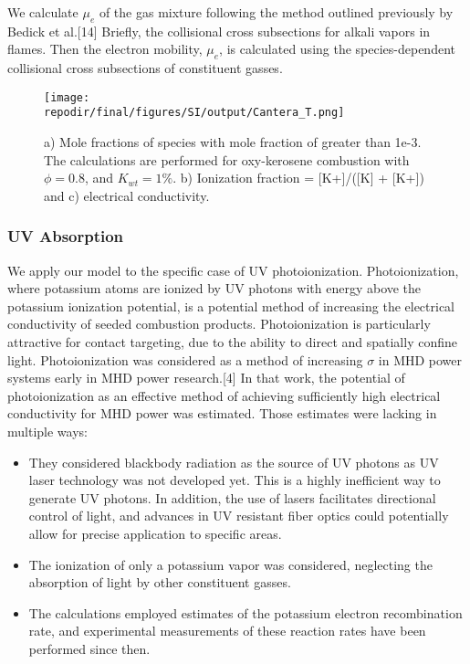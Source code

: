 We calculate $\mu_e$ of the gas mixture following the method outlined previously by Bedick et al.{[}14{]} Briefly, the collisional cross subsections for alkali vapors in flames. Then the electron mobility, \(\mu_{e}\), is calculated using the species-dependent collisional cross subsections of constituent gasses.

\begin{figure}[ht]
    \centering
    \texttt{[image: \\repodir/final/figures/SI/output/Cantera\_T.png]}
    \caption{a) Mole fractions of species with mole fraction of greater than 1e-3. The calculations are performed for oxy-kerosene combustion with \(\phi = 0.8\), and \(K_{wt} = 1\%\). b) Ionization fraction = {[}K+{]}/({[}K{]} + {[}K+{]}) and c) electrical conductivity.}
    \label{fig:SI_Cantera_T}
\end{figure} 


\hypertarget{photoionization}{%
\subsubsection{UV Absorption}\label{photoionization}}



We apply our model to the specific case of UV photoionization. Photoionization, where potassium atoms are ionized by UV photons with energy above the potassium ionization potential, is a potential method of increasing the electrical conductivity of seeded combustion products. Photoionization is particularly attractive for contact targeting, due to the ability to direct and spatially confine light. Photoionization was considered as a method of increasing \(\sigma\) in MHD power systems early in MHD power research.{[}4{]} In that work, the potential of photoionization as an effective method of achieving sufficiently high electrical conductivity for MHD power was estimated. Those estimates were lacking in multiple ways:

\begin{itemize}
\item
  They considered blackbody radiation as the source of UV photons as UV laser technology was not developed yet. This is a highly inefficient way to generate UV photons. In addition, the use of lasers facilitates directional control of light, and advances in UV resistant fiber optics could potentially allow for precise application to specific areas.
\item
  The ionization of only a potassium vapor was considered, neglecting the absorption of light by other constituent gasses.
\item
  The calculations employed estimates of the potassium electron recombination rate, and experimental measurements of these reaction rates have been performed since then.
\end{itemize}

